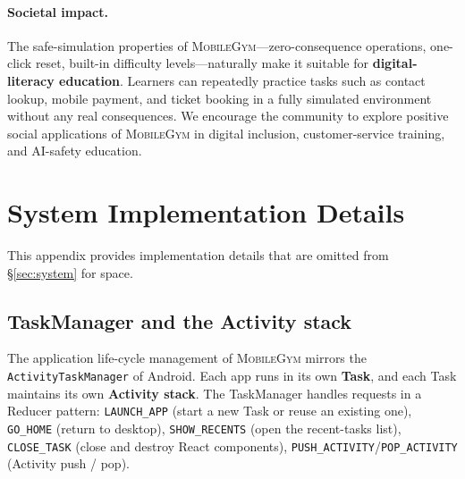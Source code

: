 \documentclass{llmxive}
\providecommand{\sys}{\textsc{MobileGym}}
\begin{document}
\paragraph{Societal impact.} The safe-simulation properties of \sys{}—zero-consequence operations, one-click reset, built-in difficulty levels—naturally make it suitable for \textbf{digital-literacy education}. Learners can repeatedly practice tasks such as contact lookup, mobile payment, and ticket booking in a fully simulated environment without any real consequences. We encourage the community to explore positive social applications of \sys{} in digital inclusion, customer-service training, and AI-safety education.






\appendix

\section{System Implementation Details}\label{app:system-detail}

This appendix provides implementation details that are omitted from §\ref{sec:system} for space.

\subsection{TaskManager and the Activity stack}

The application life-cycle management of \sys{} mirrors the \texttt{ActivityTaskManager} of Android. Each app runs in its own \textbf{Task}, and each Task maintains its own \textbf{Activity stack}. The TaskManager handles requests in a Reducer pattern: \texttt{LAUNCH\_APP} (start a new Task or reuse an existing one), \texttt{GO\_HOME} (return to desktop), \texttt{SHOW\_RECENTS} (open the recent-tasks list), \texttt{CLOSE\_TASK} (close and destroy React components), \texttt{PUSH\_ACTIVITY}/\texttt{POP\_ACTIVITY} (Activity push / pop).
\end{document}
